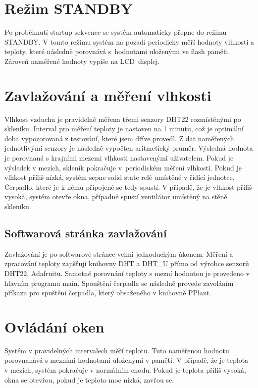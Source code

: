\section{Režim STANDBY}
Po proběhnutí startup sekvence se systém automaticky přepne do režimu STANDBY.
V tomto režimu systém na pozadí periodicky měří hodnoty vlhkosti a teploty, které následně porovnává s~hodnotami uloženými ve flash paměti.
Zároveň naměřené hodnoty vypíše na LCD~displej.

\section{Zavlažování a měření vlhkosti}
Vlhkost vzduchu je pravidelně měřena třemi senzory DHT22 rozmístěnými po skleníku. %
Interval pro měření teploty je nastaven na 1 minutu, což je optimální doba vypozorovaná z testování, které jsem dříve provedl.
Z dat naměřených jednotlivými senzory je následně vypočten aritmetický průměr.
Výsledná hodnota je porovnaná s krajními mezemi vlhkosti nastavenými uživatelem.
Pokud je výsledek v mezích, skleník pokračuje v~periodickém měření vlhkosti. Pokud je vlhkost příliš nízká, systém sepne solid state relé umístěné v řídící jednotce. 
Čerpadlo, které je k němu připojené se tedy spustí. 
V případě, že je vlhkost příliš vysoká, systém otevře okna, případně spustí ventilátor umístěný na stěně skleníku.

\subsection{Softwarová stránka zavlažování}
Zavlažování je po softwarové stránce velmi jednoduchým úkonem.
Měření a zpracování teploty zajišťují knihovny DHT a DHT\_U přímo od výrobce senzorů DHT22, Adafruitu.
Samotné porovnání teploty s mezní hodnotou je provedeno v hlavním programu main. 
Spouštění čerpadla se následně provede zavoláním příkazu pro spuštění čerpadla, který obsaženého v knihovně PPlant.

\section{Ovládání oken}
Systém v pravidelných intervalech měří teplotu.
Tuto naměřenou hodnotu porovnanává s mezními hodnotami uloženými v paměti.
V případě, že je teplota v mezích, systém pokračuje v normálním chodu.
Pokud je teplota příliš vysoká, okna se otevřou, pokud je teplota moc nízká, zavřou se.

